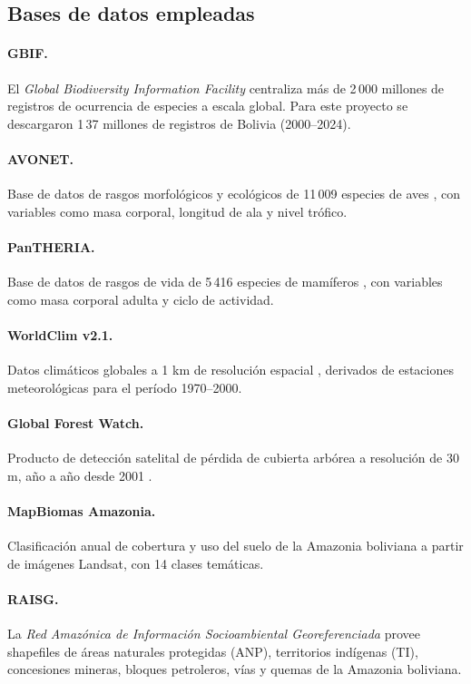 \documentclass[12pt,a4paper]{article}
\begin{document}
\subsection{Bases de datos empleadas}

\paragraph{GBIF.} El \textit{Global Biodiversity Information Facility} centraliza más de 2\,000
millones de registros de ocurrencia de especies a escala global.
Para este proyecto se descargaron 1\,37 millones de registros de Bolivia (2000--2024).

\paragraph{AVONET.} Base de datos de rasgos morfológicos y ecológicos de 11\,009 especies de aves
\cite{tobias2022avonet}, con variables como masa corporal, longitud de ala y nivel trófico.

\paragraph{PanTHERIA.} Base de datos de rasgos de vida de 5\,416 especies de mamíferos
\cite{jones2009pantheria}, con variables como masa corporal adulta y ciclo de actividad.

\paragraph{WorldClim v2.1.} Datos climáticos globales a 1 km de resolución espacial \cite{fick2017worldclim},
derivados de estaciones meteorológicas para el período 1970--2000.

\paragraph{Global Forest Watch.} Producto de detección satelital de pérdida de cubierta arbórea
a resolución de 30 m, año a año desde 2001 \cite{hansen2013gfw}.

\paragraph{MapBiomas Amazonia.} Clasificación anual de cobertura y uso del suelo de la Amazonia
boliviana a partir de imágenes Landsat, con 14 clases temáticas.

\paragraph{RAISG.} La \textit{Red Amazónica de Información Socioambiental Georeferenciada} provee
shapefiles de áreas naturales protegidas (ANP), territorios indígenas (TI), concesiones mineras,
bloques petroleros, vías y quemas de la Amazonia boliviana.
\end{document}
